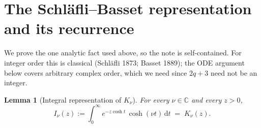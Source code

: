 \documentclass[11pt]{article}
\newtheorem{lemma}{Lemma}
\theoremstyle{definition}
\theoremstyle{remark}
\newcommand{\dd}{\mathrm{d}}
\newcommand{\Cx}{\mathbb{C}}
\begin{document}
\appendix

\section{The Schl\"afli--Basset representation and its recurrence}
\label{app:rep}

We prove the one analytic fact used above, so the note is self-contained. For integer order this is classical
(Schl\"afli 1873; Basset 1889); the ODE argument below covers arbitrary complex order, which we need since
$2q+3$ need not be an integer.

\begin{lemma}[Integral representation of $K_\nu$]
\label{lem:rep}
For every $\nu\in\Cx$ and every $z>0$,
\begin{equation}
  I_\nu(z):=\int_0^\infty e^{-z\cosh t}\,\cosh(\nu t)\,\dd t \;=\; K_\nu(z).
  \label{eq:rep}
\end{equation}
\end{lemma}
\end{document}
